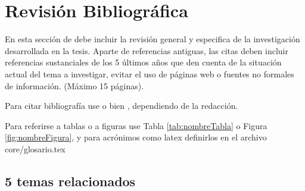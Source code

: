 
\chapter{Revisión Bibliográfica}
\label{ch:litRev} %

{\color{blue} En esta sección de debe incluir la revisión general y especifica de la investigación
desarrollada en la tesis.
Aparte de referencias antiguas, las citas deben incluir referencias sustanciales de
los 5 últimos años que den cuenta de la situación actual del tema a investigar,
evitar el uso de páginas web o fuentes no formales de información. (Máximo 15 páginas). }

\vspace{0.5cm}

Para citar bibliografía use  o bien
\cite{pastor_sustainable_2020}, dependiendo de la redacción.

Para referirse a tablas o a figuras use Tabla \ref{tab:nombreTabla} o Figura \ref{fig:nombreFigura},
y para acrónimos como \gls{latex} definirlos en el archivo core/glosario.tex

\section{5 temas relacionados}%


